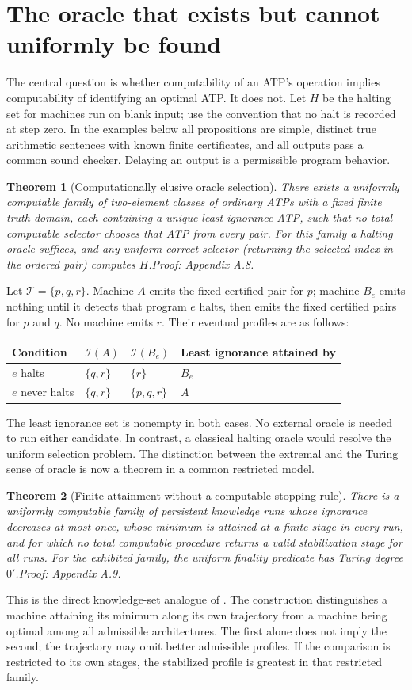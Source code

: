 \documentclass[11pt]{article}
\newtheorem{theorem}{Theorem}[section]
\newcommand{\T}{\mathcal T}\newcommand{\K}{\mathcal K}\newcommand{\I}{\mathcal I}\newcommand{\A}{\mathcal A}
\newcommand{\pf}[1]{\unskip\hspace{.6em plus 1fill}\textit{Proof: Appendix A.#1.}}
\begin{document}
\section{The oracle that exists but cannot uniformly be found}
The central question is whether computability of an ATP's operation implies computability of identifying an optimal ATP. It does not. Let $H$ be the halting set for machines run on blank input; use the convention that no halt is recorded at step zero. In the examples below all propositions are simple, distinct true arithmetic sentences with known finite certificates, and all outputs pass a common sound checker. Delaying an output is a permissible program behavior.
\begin{theorem}[Computationally elusive oracle selection]\label{th:select}
There exists a uniformly computable family of two-element classes of ordinary ATPs with a fixed finite truth domain, each containing a unique least-ignorance ATP, such that no total computable selector chooses that ATP from every pair. For this family a halting oracle suffices, and any uniform correct selector (returning the selected index in the ordered pair) computes $H$.\pf{8}
\end{theorem}
Let $\T=\{p,q,r\}$. Machine $A$ emits the fixed certified pair for $p$; machine $B_e$ emits nothing until it detects that program $e$ halts, then emits the fixed certified pairs for $p$ and $q$. No machine emits $r$. Their eventual profiles are as follows:
\begin{center}
\begin{tabular}{llll}\toprule
Condition & $\I(A)$ & $\I(B_e)$ & Least ignorance attained by\\\midrule
$e$ halts & $\{q,r\}$ & $\{r\}$ & $B_e$\\
$e$ never halts & $\{q,r\}$ & $\{p,q,r\}$ & $A$\\\bottomrule
\end{tabular}
\end{center}
The least ignorance set is nonempty in both cases. No external oracle is needed to run either candidate. In contrast, a classical halting oracle would resolve the uniform selection problem. The distinction between the extremal and the Turing sense of oracle is now a theorem in a common restricted model.

\begin{theorem}[Finite attainment without a computable stopping rule]\label{th:stop}
There is a uniformly computable family of persistent knowledge runs whose ignorance decreases at most once, whose minimum is attained at a finite stage in every run, and for which no total computable procedure returns a valid stabilization stage for all runs. For the exhibited family, the uniform finality predicate has Turing degree $0'$.\pf{9}
\end{theorem}
This is the direct knowledge-set analogue of \cite[Theorem 7.3]{boundary}. The construction distinguishes a machine attaining its minimum along its own trajectory from a machine being optimal among all admissible architectures. The first alone does not imply the second; the trajectory may omit better admissible profiles. If the comparison is restricted to its own stages, the stabilized profile is greatest in that restricted family.
\end{document}
